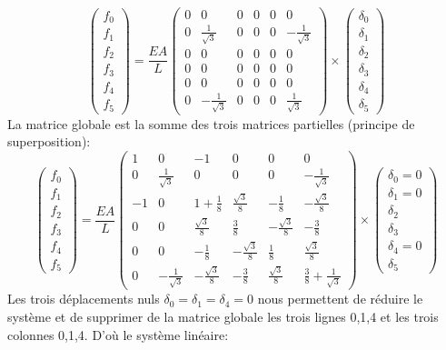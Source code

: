 \documentclass[a4paper]{article}
\begin{document}
\[\left(\begin{array}{r}f_0\\ f_1\\f_2\\f_3\\f_4\\f_5 \end{array}\right) 
=\frac{EA}{L} \left(\begin{array}{rrccrr} 
0&0&0&0&0&0\\
0&\frac{1}{\sqrt 3}&0&0&0&-\frac{1}{\sqrt 3}\\
0&0&0&0&0&0\\
0&0&0&0&0&0\\
0&0&0&0&0&0\\
0&-\frac{1}{\sqrt 3}&0&0&0&\frac{1}{\sqrt 3}
\end{array}\right)
\times
\left(\begin{array}{r}  \delta_0\\ \delta_1\\ \delta_2\\ \delta_3\\ \delta_4\\ \delta_5   \end{array}\right)
\]
La matrice globale est la somme des trois matrices partielles (principe de superposition):
\[\left(\begin{array}{r}f_0\\ f_1\\f_2\\f_3\\f_4\\f_5 \end{array}\right) 
 =\frac{EA}{L}\left(\begin{array}{rrccrr} 
1&0&-1&0&0&0\\
0&\frac{1}{\sqrt 3}&0&0&0&-\frac{1}{\sqrt 3}\\
-1&0&1+\frac 18&\frac{\sqrt 3}{8}&-\frac 18&-\frac{\sqrt 3}{8}\\
0&0&\frac{\sqrt 3}{8}&\frac 38&-\frac{\sqrt 3}{8}&-\frac 38\\
0&0&-\frac 18&-\frac{\sqrt 3}{8}&\frac 18&\frac{\sqrt 3}{8}\\
0&-\frac{1}{\sqrt 3}&-\frac{\sqrt 3}{8}&-\frac 38&\frac{\sqrt 3}{8}&\frac{ 3}{8}+\frac{1}{\sqrt 3}
\end{array}\right)
\times
\left(\begin{array}{l}  \delta_0=0\\ \delta_1=0\\ \delta_2\\ \delta_3\\ \delta_4=0\\ \delta_5   \end{array}\right)
\]
Les trois déplacements nuls $\delta_0=\delta_1=\delta_4=0$ nous permettent de réduire le système et de supprimer de la matrice globale les trois lignes 0,1,4 et les trois colonnes 0,1,4. D'où le système linéaire:
\end{document}
